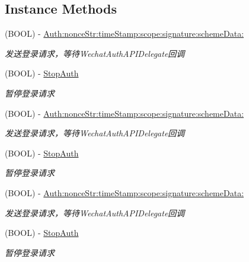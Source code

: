\subsection*{Instance Methods}
\begin{DoxyCompactItemize}
\item 
(B\+O\+OL) -\/ \mbox{\hyperlink{interface_wechat_auth_s_d_k_ae0751a15f2ab97b691932fb242ef4063}{Auth\+:nonce\+Str\+:time\+Stamp\+:scope\+:signature\+:scheme\+Data\+:}}
\begin{DoxyCompactList}\small\item\em 发送登录请求，等待\+Wechat\+Auth\+A\+P\+I\+Delegate回调 \end{DoxyCompactList}\item 
(B\+O\+OL) -\/ \mbox{\hyperlink{interface_wechat_auth_s_d_k_a0f5701e66d234c1fc5db69afbed27aca}{Stop\+Auth}}
\begin{DoxyCompactList}\small\item\em 暂停登录请求 \end{DoxyCompactList}\item 
(B\+O\+OL) -\/ \mbox{\hyperlink{interface_wechat_auth_s_d_k_ae0751a15f2ab97b691932fb242ef4063}{Auth\+:nonce\+Str\+:time\+Stamp\+:scope\+:signature\+:scheme\+Data\+:}}
\begin{DoxyCompactList}\small\item\em 发送登录请求，等待\+Wechat\+Auth\+A\+P\+I\+Delegate回调 \end{DoxyCompactList}\item 
(B\+O\+OL) -\/ \mbox{\hyperlink{interface_wechat_auth_s_d_k_a0f5701e66d234c1fc5db69afbed27aca}{Stop\+Auth}}
\begin{DoxyCompactList}\small\item\em 暂停登录请求 \end{DoxyCompactList}\item 
(B\+O\+OL) -\/ \mbox{\hyperlink{interface_wechat_auth_s_d_k_ae0751a15f2ab97b691932fb242ef4063}{Auth\+:nonce\+Str\+:time\+Stamp\+:scope\+:signature\+:scheme\+Data\+:}}
\begin{DoxyCompactList}\small\item\em 发送登录请求，等待\+Wechat\+Auth\+A\+P\+I\+Delegate回调 \end{DoxyCompactList}\item 
(B\+O\+OL) -\/ \mbox{\hyperlink{interface_wechat_auth_s_d_k_a0f5701e66d234c1fc5db69afbed27aca}{Stop\+Auth}}
\begin{DoxyCompactList}\small\item\em 暂停登录请求 \end{DoxyCompactList}\end{DoxyCompactItemize}
